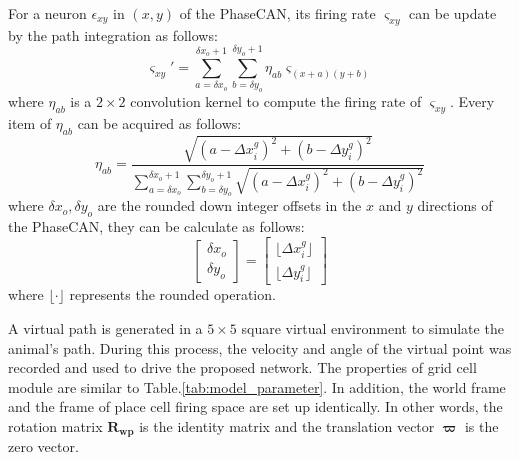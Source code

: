\documentclass[final,5p,times,twocolumn,authoryear]{elsarticle}
\begin{document}
For a neuron $\epsilon_{xy}$ in $(x,y)$ of the PhaseCAN, its firing rate $\varsigma_{xy}$ can be update by the path integration as follows:
\begin{equation}\label{rate_path_integration}
	\varsigma_{xy}' = \sum_{a=\delta x_o }^{\delta x_o +1}\sum_{b=\delta y_o}^{\delta y_o +1} \eta_{ab} \varsigma_{(x+a)(y+b)}
\end{equation}
where $\eta_{ab}$ is a $2\times2$ convolution kernel to compute the firing rate of $\varsigma_{xy}$. Every item of $\eta_{ab}$ can be acquired as follows:
\begin{equation}\label{convolution_kernel}
	\eta_{ab} = \frac{\sqrt{(a-\Delta x_i^g)^2+(b-\Delta y_i^g)^2}}{\sum_{a=\delta x_o }^{\delta x_o +1}\sum_{b=\delta y_o}^{\delta y_o +1}\sqrt{(a-\Delta x_i^g)^2+(b-\Delta y_i^g)^2}}
\end{equation}
where $\delta x_o,\delta y_o $ are the rounded down integer offsets in the $x$ and $y$ directions of the PhaseCAN, they can be calculate as follows:
\begin{equation}\label{rounded-offsets}
	\begin{bmatrix}
		\delta x_o\\
		\delta y_o
	\end{bmatrix}
	= 	
	\begin{bmatrix}
		\lfloor \Delta x_i^g \rfloor\\
		\lfloor \Delta y_i^g \rfloor
	\end{bmatrix}
\end{equation}
where $\lfloor \cdot \rfloor$ represents the rounded operation.

A virtual path is generated in a $5\times5$ square virtual environment to simulate the animal's path. During this process, the velocity and angle of the virtual point was recorded and used to drive the proposed network. The properties of grid cell module are similar to Table.\ref{tab:model_parameter}. In addition, the world frame and the frame of place cell firing space are set up identically. In other words, the rotation matrix $\bm{R_{wp}}$ is the identity matrix and the translation vector $\boldsymbol{\varpi}$ is the zero vector. 
\end{document}
